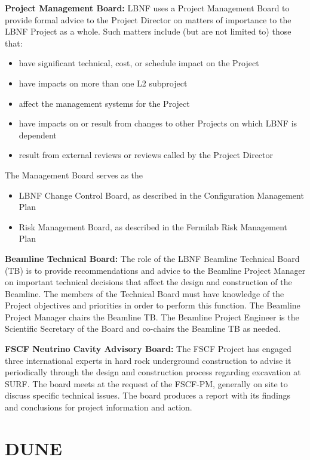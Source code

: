 \textbf{Project Management Board:} LBNF uses a Project Management Board to provide formal advice to the Project Director on matters of importance to the LBNF Project as a whole. Such matters include (but are not limited to) those that:
\begin{itemize}
\item have significant technical, cost, or schedule impact on the Project
\item have impacts on more than one L2 subproject
\item affect the management systems for the Project
\item have impacts on or result from changes to other Projects on which LBNF is dependent
\item result from external reviews or reviews called by the Project Director
\end{itemize}
The Management Board serves as the
\begin{itemize}
\item LBNF Change Control Board, as described in the Configuration Management Plan \fixme{[ref]}
\item Risk Management Board, as described in the Fermilab Risk Management Plan  \fixme{[ref]}
\end{itemize}

\textbf{Beamline Technical Board:} The role of the LBNF Beamline Technical Board (TB) is to provide recommendations and advice to the Beamline Project Manager on important technical decisions that affect the design and construction of the Beamline. The members of the Technical Board must have knowledge of the Project objectives and priorities in order to perform this function. The Beamline Project Manager chairs the Beamline TB. The Beamline Project Engineer is the Scientific Secretary of the Board and co-chairs the Beamline TB as needed. 

\textbf{FSCF Neutrino Cavity Advisory Board:} The FSCF Project has engaged three international experts in hard rock underground construction to advise it periodically through the design and construction process regarding excavation at SURF. The board meets at the request of the FSCF-PM, generally on site to discuss specific technical issues. The board produces a report with its findings and conclusions for project information and action. 



\section{DUNE}

